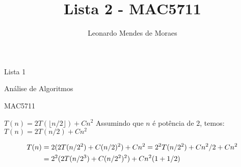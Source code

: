 \documentclass[12pt,a4paper]{article}
\author{Leonardo Mendes de Moraes }
\title{Lista 2 - MAC5711}
\date{}
\begin{document}
	\begin{center}
    {\huge Lista 1 \par} {\LARGE Análise de Algoritmos \par} {\Large MAC5711
    \par}
	\end{center}

\problem
     $T(n) = 2T(\lfloor n/2 \rfloor ) + Cn^2$
    Assumindo que $n $ é potência de $2$, temos: $T(n) = 2T(n/2) + Cn^2$

    \begin{equation} \label{eq1}
        \begin{split}
        T(n) & = 2(2T(n/2^2) + C(n/2)^2) + Cn^2 = 2^2T(n/2^2) + Cn^2/2 + Cn^2 \\
         & = 2^2(2T(n/2^3) + C(n/2^2)^2) + Cn^2(1 + 1/2)
        \end{split}
        \notag
        \end{equation}

\problem
\end{document}

